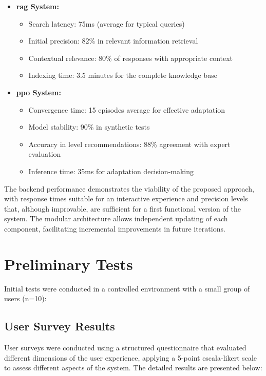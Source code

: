 \begin{itemize}
    \item \textbf{\gls{rag} System:}
    \begin{itemize}
        \item Search latency: 75ms (average for typical queries)
        \item Initial precision: 82\% in relevant information retrieval
        \item Contextual relevance: 80\% of responses with appropriate context
        \item Indexing time: 3.5 minutes for the complete knowledge base
    \end{itemize}

    \item \textbf{\gls{ppo} System:}
    \begin{itemize}
        \item Convergence time: 15 episodes average for effective adaptation
        \item Model stability: 90\% in synthetic tests
        \item Accuracy in level recommendations: 88\% agreement with expert evaluation
        \item Inference time: 35ms for adaptation decision-making
    \end{itemize}
\end{itemize}

The backend performance demonstrates the viability of the proposed approach, with response times suitable for an interactive experience and precision levels that, although improvable, are sufficient for a first functional version of the system. The modular architecture allows independent updating of each component, facilitating incremental improvements in future iterations.


\section{Preliminary Tests}
\label{pruebas-preliminares}

Initial tests were conducted in a controlled environment with a small group of users (n=10):

\subsection{User Survey Results}
\label{subsec:resultados_encuestas}

User surveys were conducted using a structured questionnaire that evaluated different dimensions of the user experience, applying a 5-point \gls{escala-likert} scale to assess different aspects of the system. The detailed results are presented below:

